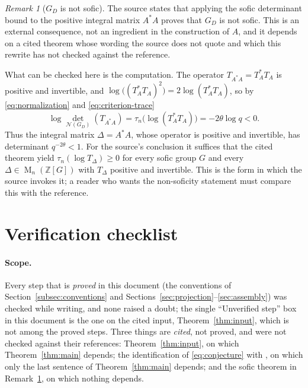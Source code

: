 \documentclass[11pt]{article}
\theoremstyle{remark}
\newtheorem{remark}[theorem]{Remark}
\numberwithin{equation}{section}
\newcommand{\Z}{\mathbb Z}
\newcommand{\Mat}{\operatorname{M}}
\newcommand{\N}{\mathcal N}
\begin{document}
\begin{remark}[$G_D$ is not sofic]\label{rem:sofic}
The source states that applying the sofic determinant bound \cite[Theorem 5]{ElekSzabo2005} to the positive integral matrix $A^*A$ proves that $G_D$ is not sofic. This is an external consequence, not an ingredient in the construction of $A$, and it depends on a cited theorem whose wording the source does not quote and which this rewrite has not checked against the reference.

What can be checked here is the computation. The operator $T_{A^*A}=T_A^*T_A$ is positive and invertible, and $\log\bigl((T_A^*T_A)^2\bigr)=2\log(T_A^*T_A)$, so by \eqref{eq:normalization} and \eqref{eq:criterion-trace}
\[
 \log\det_{\N(G_D)}(T_{A^*A})=\tau_n\bigl(\log(T_A^*T_A)\bigr)=-2\theta\log q<0 .
\]
Thus the integral matrix $\Delta=A^*A$, whose operator is positive and invertible, has determinant $q^{-2\theta}<1$. For the source's conclusion it suffices that the cited theorem yield $\tau_n(\log T_\Delta)\ge0$ for every sofic group $G$ and every $\Delta\in\Mat_n(\Z[G])$ with $T_\Delta$ positive and invertible. This is the form in which the source invokes it; a reader who wants the non-soficity statement must compare this with the reference.
\end{remark}

\section*{Verification checklist}

\paragraph{Scope.} Every step that is \emph{proved} in this document (the conventions of Section~\ref{subsec:conventions} and Sections~\ref{sec:projection}--\ref{sec:assembly}) was checked while writing, and none raised a doubt; the single ``Unverified step'' box in this document is the one on the cited input, Theorem~\ref{thm:input}, which is not among the proved steps. Three things are \emph{cited}, not proved, and were not checked against their references: Theorem~\ref{thm:input}, on which Theorem~\ref{thm:main} depends; the identification of \eqref{eq:conjecture} with \cite[Conjecture 13.2]{Luck2002}, on which only the last sentence of Theorem~\ref{thm:main} depends; and the sofic theorem in Remark~\ref{rem:sofic}, on which nothing depends.
\end{document}
